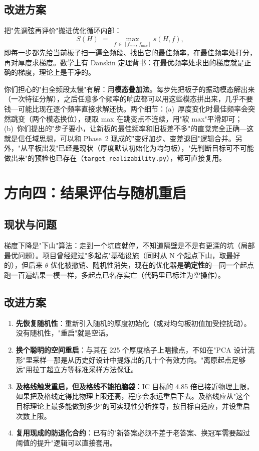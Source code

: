 \documentclass[11pt,a4paper]{article}
\newcommand{\code}[1]{\texttt{#1}}
\begin{document}
\subsection{改进方案}

把"先调弦再评价"搬进优化循环内部：
\begin{equation}
S(H) \;=\; \max_{f\,\in\,[f_{\min},\,f_{\max}]} s(H, f),
\end{equation}
即每一步都先给当前板子扫一遍全频段、找出它的最佳频率，在最佳频率处打分，再对厚度求梯度。数学上有 Danskin 定理背书：在最优频率处求出的梯度就是正确的梯度，理论上是干净的。

你们担心的"扫全频段太慢"有解：用\textbf{模态叠加法}。每步先把板子的振动模态解出来（一次特征分解），之后任意多个频率的响应都可以用这些模态拼出来，几乎不要钱---可能比现在逐个频率直接求解还快。两个细节：(a)~厚度变化时最佳频率会突然跳变（两个模态换位），硬取 max 在跳变点不连续，用"软 max"平滑即可；(b)~你们提出的"步子要小，让新板的最佳频率和旧板差不多"的直觉完全正确---这就是信任域思想，可以和 Phase~2 现成的"变好加步、变差退回"逻辑合并。另外，"从平板出发"已经是现状（厚度默认初始化为均匀板），"先判断目标可不可能做出来"的预检也已存在（\code{target\_realizability.py}），都可直接复用。

\section{方向四：结果评估与随机重启}

\subsection{现状与问题}

梯度下降是"下山"算法：走到一个坑底就停，不知道隔壁是不是有更深的坑（局部最优问题）。项目曾经建过"多起点"基础设施（同时从 N 个起点下山，取最好的），但后来 $\theta$ 优化被撤销、随机性消失，现在的优化器是\textbf{确定性}的---同一个起点跑一百遍结果一模一样，多起点已名存实亡（代码里已标注为空操作）。

\subsection{改进方案}

\begin{enumerate}[leftmargin=2em]
\item \textbf{先恢复随机性}：重新引入随机的厚度初始化（或对均匀板初值加受控扰动）。没有随机性，"重启"就是空话。
\item \textbf{换个聪明的空间重启}：与其在 225 个厚度格子上瞎撒点，不如在"PCA 设计流形"里采样---那是从历史好设计中提炼出的几十个有效方向。"离原起点足够远"用拉丁超立方等标准采样方法保证。
\item \textbf{及格线触发重启，但及格线不能拍脑袋}：IC 目标的 4.85 倍已接近物理上限，如果把及格线定得比物理上限还高，程序会永远重启下去。及格线应从"这个目标理论上最多能做到多少"的可实现性分析推导，按目标自适应，并设重启次数上限。
\item \textbf{复用现成的防退化合约}：已有的"新答案必须不差于老答案、换冠军需要超过阈值的提升"逻辑可以直接套用。
\end{enumerate}
\end{document}

